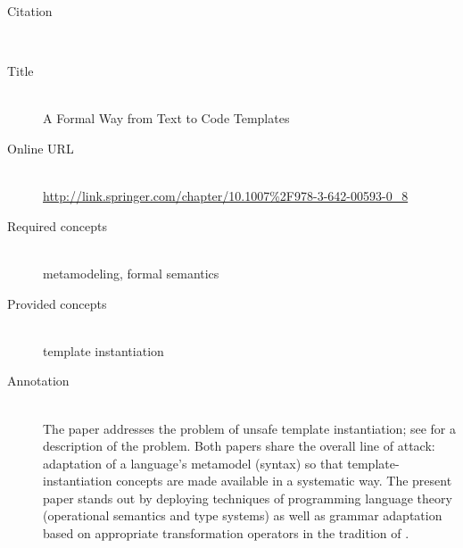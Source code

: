 \begin{description}
\item[Citation]\mbox{}\\
\cite{Wachsmuth09}
\item[Title]\mbox{}\\
A Formal Way from Text to Code Templates
\item[Online URL]\mbox{}\\
{\footnotesize\url{http://link.springer.com/chapter/10.1007%2F978-3-642-00593-0_8}}
\item[Required concepts]\mbox{}\\
metamodeling, formal semantics\item[Provided concepts]\mbox{}\\
template instantiation\item[Annotation]\mbox{}\\
The paper addresses the problem of unsafe template instantiation; see \cite{HeidenreichJSWB09} for a description of the problem. Both papers share the overall line of attack: adaptation of a language's metamodel (syntax) so that template-instantiation concepts are made available in a systematic way. The present paper stands out by deploying techniques of programming language theory (operational semantics and type systems) as well as grammar adaptation based on appropriate transformation operators in the tradition of \cite{Laemmel01}.
\end{description}

